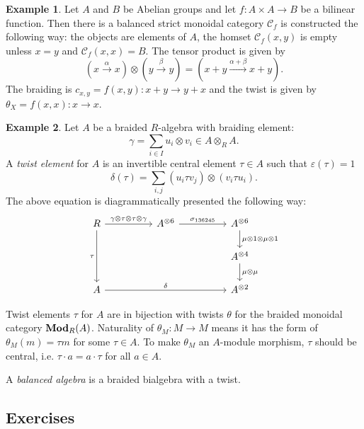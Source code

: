 \documentclass[8pt]{article}
\theoremstyle{definition}
\theoremstyle{definition}
\theoremstyle{definition}
\theoremstyle{definition}
\theoremstyle{definition}
\theoremstyle{definition}
\theoremstyle{definition}
\theoremstyle{definition}
\theoremstyle{definition}
\theoremstyle{definition}
\theoremstyle{definition}
\theoremstyle{definition}
\newtheorem{example}{Example}[section]
\theoremstyle{definition}
\theoremstyle{definition}
\theoremstyle{question}
\begin{document}
\begin{example}
  Let $A$ and $B$ be Abelian groups and let $f : A \times A \to B$ be a bilinear function. Then there is a balanced strict monoidal category
  $\mathcal{C}_f$ is constructed the following way: the objects are elements of $A$, the homset $\mathcal{C}_f(x, y)$ is empty unless
  $x = y$ and $\mathcal{C}_f(x,x) = B$. The tensor product is given by
  \[
  (x \xrightarrow{\alpha} x) \otimes (y \xrightarrow{\beta} y) = (x+y \xrightarrow{\alpha + \beta} x + y).
  \]
  The braiding is $c_{x,y} = f(x,y) : x + y \to y + x$ and the twist is given by $\theta_X = f(x,x) : x \to x$.
\end{example}
\begin{example}
  Let $A$ be a braided $R$-algebra with braiding element:
  \[
  \gamma = \sum \limits_{i \in I} u_i \otimes v_i \in A \otimes_R A.
  \]
  A \emph{twist element} for $A$ is an invertible central element $\tau \in A$ such that $\varepsilon(\tau) = 1$
  \[
  \delta(\tau) = \sum \limits_{i,j} (u_i \tau v_j) \otimes (v_i \tau u_i).
  \]
  The above equation is diagrammatically presented the following way:
  \[
  \begin{tikzcd}
    R \ar[dd, "\tau"'] \ar[rr, "\gamma \otimes \tau \otimes \tau \otimes \gamma"] && A^{\otimes 6} \ar[rr, "\sigma_{136245}"] && A^{\otimes 6} \ar[d, "\mu \otimes 1 \otimes \mu \otimes 1"] \\
    &&&& A^{\otimes 4} \ar[d, "\mu \otimes \mu"] \\
    A \ar[rrrr, "\delta"] &&&& A^{\otimes 2}
  \end{tikzcd}
  \]
\end{example}

Twist elements $\tau$ for $A$ are in bijection with twists $\theta$ for the braided monoidal category ${\bf Mod}_R(A)$.
Naturality of $\theta_M : M \to M$ means it has the form of $\theta_M(m) = \tau m$ for some $\tau \in A$. To make $\theta_M$ an $A$-module morphism,
$\tau$ should be central, i.e. $\tau \cdot a = a \cdot \tau$ for all $a \in A$.

A \emph{balanced algebra} is a braided bialgebra with a twist.

\subsection{Exercises}
\end{document}
